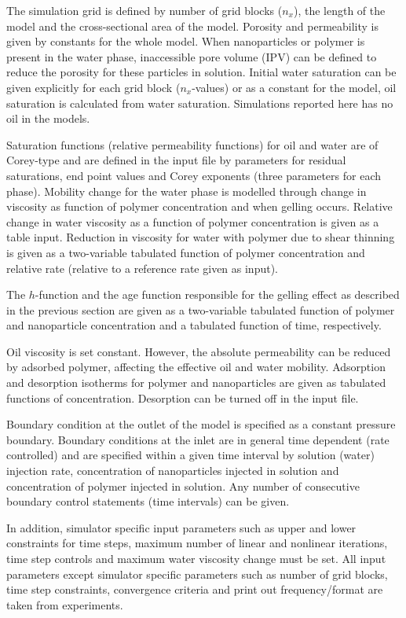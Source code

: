 The simulation grid is defined by number of grid blocks ($n_x$), the length of the model and the cross-sectional area of the model. Porosity and permeability is given by constants for the whole model. When nanoparticles or polymer is present in the water phase, inaccessible pore volume (IPV) can be defined to reduce the porosity for these particles in solution. Initial water saturation can be given explicitly for each grid block ($n_x$-values) or as a constant for the model, oil saturation is calculated from water saturation. Simulations reported here has no oil in the models.

Saturation functions (relative permeability functions) for oil and water are of Corey-type and are defined in the input file by parameters for residual saturations, end point values and Corey exponents (three parameters for each phase). Mobility change for the water phase is modelled through change in viscosity as function of polymer concentration and when gelling occurs. Relative change in water viscosity as a function of polymer concentration is given as a table input. Reduction in viscosity for water with polymer due to shear thinning is given as a two-variable tabulated function of polymer concentration and relative rate (relative to a reference rate given as input).   

The $h$-function and the age function responsible for the gelling effect as described in the previous section are given as a two-variable tabulated function of polymer and nanoparticle concentration and a tabulated function of time, respectively. 

Oil viscosity is set constant. However, the absolute permeability can be reduced by adsorbed polymer, affecting the effective oil and water mobility. Adsorption and desorption isotherms for polymer and nanoparticles are given as tabulated functions of concentration. Desorption can be turned off in the input file.

Boundary condition at the outlet of the model is specified as a constant pressure boundary. Boundary conditions at the inlet are in general time dependent (rate controlled) and are specified within a given time interval by solution (water) injection rate, concentration of nanoparticles injected in solution and concentration of polymer injected in solution. Any number of consecutive boundary control statements (time intervals) can be given. 

In addition, simulator specific input parameters such as upper and lower constraints for time steps, maximum number of linear and nonlinear iterations, time step controls and maximum water viscosity change must be set. All input parameters except simulator specific parameters such as number of grid blocks, time step constraints, convergence criteria and print out frequency/format are taken from experiments. 

